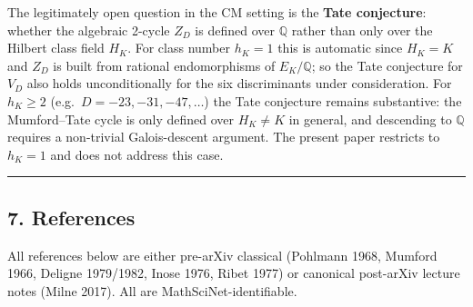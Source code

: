 \documentclass[
  11pt,
  a4paper,
]{article}
\begin{document}
The legitimately open question in the CM setting is the \textbf{Tate conjecture}: whether the algebraic 2-cycle \(Z_D\) is defined over \(\mathbb{Q}\) rather than only over the Hilbert class field \(H_K\). For class number \(h_K = 1\) this is automatic since \(H_K = K\) and \(Z_D\) is built from rational endomorphisms of \(E_K / \mathbb{Q}\); so the Tate conjecture for \(V_D\) also holds unconditionally for the six discriminants under consideration. For \(h_K \geq 2\) (e.g.\ \(D = -23, -31, -47, \ldots\)) the Tate conjecture remains substantive: the Mumford--Tate cycle is only defined over \(H_K \neq K\) in general, and descending to \(\mathbb{Q}\) requires a non-trivial Galois-descent argument. The present paper restricts to \(h_K = 1\) and does not address this case.

\begin{center}\rule{0.5\linewidth}{0.5pt}\end{center}

\hypertarget{references}{%
\subsection{7. References}\label{references}}

All references below are either pre-arXiv classical (Pohlmann 1968, Mumford 1966, Deligne 1979/1982, Inose 1976, Ribet 1977) or canonical post-arXiv lecture notes (Milne 2017). All are MathSciNet-identifiable.
\end{document}
